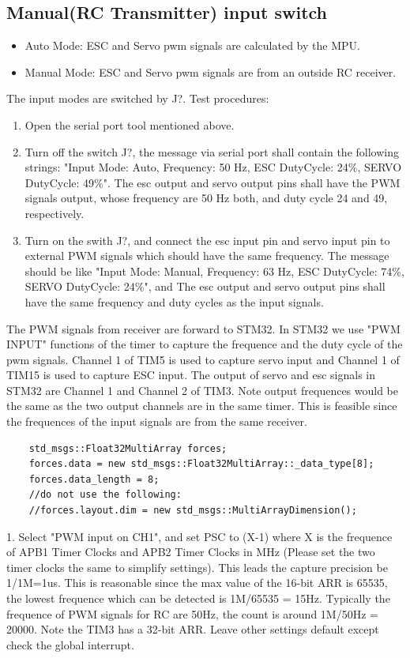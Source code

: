 \documentclass{article}
\begin{document}
\subsection{Manual(RC Transmitter) input switch}
\begin{itemize}
    \item Auto Mode: ESC and Servo pwm signals are calculated by the MPU.
    \item Manual Mode: ESC and Servo pwm signals are from an outside RC receiver.
\end{itemize} 
The input modes are switched by J?.
Test procedures:
\begin{enumerate}
    \item Open the serial port tool mentioned above. 
    \item Turn off the switch J?, the message via serial port shall contain the following strings: "Input Mode: Auto, Frequency: 50 Hz, ESC DutyCycle: 24\%, SERVO DutyCycle: 49\%". The esc output and servo output pins shall have the PWM signals output, whose frequency are 50 Hz both, and duty cycle 24 and 49, respectively.
    \item Turn on the swith J?, and connect the esc input pin and servo input pin to external PWM signals which should have the same frequency. The message should be like "Input Mode: Manual, Frequency: 63 Hz, ESC DutyCycle: 74\%, SERVO DutyCycle: 24\%", and The esc output and servo output pins shall have the same frequency and duty cycles as the input signals.
\end{enumerate}


The PWM signals from receiver are forward to STM32. In STM32 we use "PWM INPUT" functions of the timer to capture the frequence and the duty cycle of the pwm signals. Channel 1 of TIM5 is used to capture servo input and Channel 1 of TIM15 is used to capture ESC input. The output of servo and esc signals in STM32 are Channel 1 and Channel 2 of TIM3. Note output frequences would be the same as the two output channels are in the same timer. This is feasible since the frequences of the input signals are from the same receiver.
\begin{lstlisting}
	std_msgs::Float32MultiArray forces;
	forces.data = new std_msgs::Float32MultiArray::_data_type[8];
	forces.data_length = 8;
	//do not use the following:
	//forces.layout.dim = new std_msgs::MultiArrayDimension();

\end{lstlisting}
1. Select "PWM input on CH1", and set PSC to (X-1) where X is the frequence of APB1 Timer Clocks and APB2 Timer Clocks in MHz (Please set the two timer clocks the same to simplify settings). This leads the capture precision be 1/1M=1us. This is reasonable since the max value of the 16-bit ARR is 65535, the lowest frequence which can be detected is 1M/65535 = 15Hz. Typically the frequence of PWM signals for RC are 50Hz, the count is around 1M/50Hz = 20000. Note the TIM3 has a 32-bit ARR. 
Leave other settings default except check the global interrupt.
\end{document}
